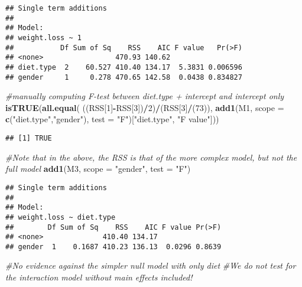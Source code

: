 \documentclass[]{book}
\newenvironment{Shaded}{\begin{snugshade}}{\end{snugshade}}
\newcommand{\CommentTok}[1]{\textcolor[rgb]{0.56,0.35,0.01}{\textit{#1}}}
\newcommand{\DataTypeTok}[1]{\textcolor[rgb]{0.13,0.29,0.53}{#1}}
\newcommand{\DecValTok}[1]{\textcolor[rgb]{0.00,0.00,0.81}{#1}}
\newcommand{\KeywordTok}[1]{\textcolor[rgb]{0.13,0.29,0.53}{\textbf{#1}}}
\newcommand{\NormalTok}[1]{#1}
\newcommand{\OperatorTok}[1]{\textcolor[rgb]{0.81,0.36,0.00}{\textbf{#1}}}
\newcommand{\StringTok}[1]{\textcolor[rgb]{0.31,0.60,0.02}{#1}}
\theoremstyle{definition}
\theoremstyle{definition}
\theoremstyle{definition}
\theoremstyle{remark}
\begin{document}
\begin{verbatim}
## Single term additions
## 
## Model:
## weight.loss ~ 1
##           Df Sum of Sq    RSS    AIC F value   Pr(>F)
## <none>                 470.93 140.62                 
## diet.type  2    60.527 410.40 134.17  5.3831 0.006596
## gender     1     0.278 470.65 142.58  0.0438 0.834827
\end{verbatim}

\begin{Shaded}
\begin{Highlighting}[]
\CommentTok{#manually computing F-test between diet.type + intercept and intercept only}
\KeywordTok{isTRUE}\NormalTok{(}\KeywordTok{all.equal}\NormalTok{( }
\NormalTok{  ((RSS[}\DecValTok{1}\NormalTok{]}\OperatorTok{-}\NormalTok{RSS[}\DecValTok{3}\NormalTok{])}\OperatorTok{/}\DecValTok{2}\NormalTok{)}\OperatorTok{/}\NormalTok{(RSS[}\DecValTok{3}\NormalTok{]}\OperatorTok{/}\NormalTok{(}\DecValTok{73}\NormalTok{)), }
  \KeywordTok{add1}\NormalTok{(M1, }\DataTypeTok{scope =} \KeywordTok{c}\NormalTok{(}\StringTok{"diet.type"}\NormalTok{,}\StringTok{"gender"}\NormalTok{), }\DataTypeTok{test =} \StringTok{"F"}\NormalTok{)[}\StringTok{"diet.type"}\NormalTok{, }\StringTok{"F value"}\NormalTok{]))}
\end{Highlighting}
\end{Shaded}

\begin{verbatim}
## [1] TRUE
\end{verbatim}

\begin{Shaded}
\begin{Highlighting}[]
\CommentTok{#Note that in the above, the RSS is that of the more complex model, but not the full model}
\KeywordTok{add1}\NormalTok{(M3, }\DataTypeTok{scope =} \StringTok{"gender"}\NormalTok{, }\DataTypeTok{test =} \StringTok{"F"}\NormalTok{)}
\end{Highlighting}
\end{Shaded}

\begin{verbatim}
## Single term additions
## 
## Model:
## weight.loss ~ diet.type
##        Df Sum of Sq    RSS    AIC F value Pr(>F)
## <none>              410.40 134.17               
## gender  1    0.1687 410.23 136.13  0.0296 0.8639
\end{verbatim}

\begin{Shaded}
\begin{Highlighting}[]
\CommentTok{#No evidence against the simpler null model with only diet}
\CommentTok{#We do not test for the interaction model without main effects included!}
\end{Highlighting}
\end{Shaded}
\end{document}
